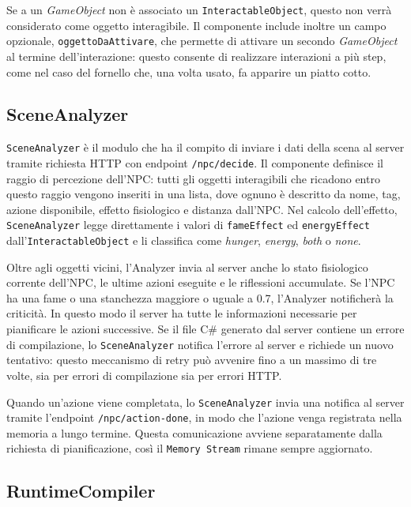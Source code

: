 Se a un \textit{GameObject} non è associato un \texttt{InteractableObject}, questo non verrà considerato come oggetto interagibile. Il componente include inoltre un campo opzionale, \texttt{oggettoDaAttivare}, che permette di attivare un secondo \textit{GameObject} al termine dell'interazione: questo consente di realizzare interazioni a più step, come nel caso del fornello che, una volta usato, fa apparire un piatto cotto.


\subsection{SceneAnalyzer}

\texttt{SceneAnalyzer} è il modulo che ha il compito di inviare i dati della scena al server tramite richiesta HTTP con endpoint \texttt{/npc/decide}. Il componente definisce il raggio di percezione dell'NPC: tutti gli oggetti interagibili che ricadono entro questo raggio vengono inseriti in una lista, dove ognuno è descritto da nome, tag, azione disponibile, effetto fisiologico e distanza dall'NPC. Nel calcolo dell'effetto, \texttt{SceneAnalyzer} legge direttamente i valori di \texttt{fameEffect} ed \texttt{energyEffect} dall'\texttt{InteractableObject} e li classifica come \textit{hunger}, \textit{energy}, \textit{both} o \textit{none}.

Oltre agli oggetti vicini, l'Analyzer invia al server anche lo stato fisiologico corrente dell'NPC, le ultime azioni eseguite e le riflessioni accumulate. Se l'NPC ha una fame o una stanchezza maggiore o uguale a 0.7, l'Analyzer notificherà la criticità. In questo modo il server ha tutte le informazioni necessarie per pianificare le azioni successive. Se il file C\# generato dal server contiene un errore di compilazione, lo \texttt{SceneAnalyzer} notifica l'errore al server e richiede un nuovo tentativo: questo meccanismo di retry può avvenire fino a un massimo di tre volte, sia per errori di compilazione sia per errori HTTP.

Quando un'azione viene completata, lo \texttt{SceneAnalyzer} invia una notifica al server tramite l'endpoint \texttt{/npc/action-done}, in modo che l'azione venga registrata nella memoria a lungo termine. Questa comunicazione avviene separatamente dalla richiesta di pianificazione, così il \texttt{Memory Stream} rimane sempre aggiornato.

\subsection{RuntimeCompiler}

